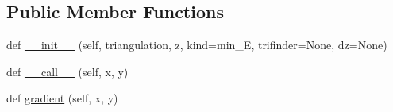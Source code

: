\subsection*{Public Member Functions}
\begin{DoxyCompactItemize}
\item 
def \hyperlink{classmatplotlib_1_1tri_1_1triinterpolate_1_1CubicTriInterpolator_a0c3d78be256683e57f25356c1fc7fc5f}{\+\_\+\+\_\+init\+\_\+\+\_\+} (self, triangulation, z, kind=\textquotesingle{}min\+\_\+E\textquotesingle{}, trifinder=None, dz=None)
\item 
def \hyperlink{classmatplotlib_1_1tri_1_1triinterpolate_1_1CubicTriInterpolator_acd8339c691a476835149466fa3e0fcd4}{\+\_\+\+\_\+call\+\_\+\+\_\+} (self, x, y)
\item 
def \hyperlink{classmatplotlib_1_1tri_1_1triinterpolate_1_1CubicTriInterpolator_a16ac27d3a77ed963eaaca315f1304a27}{gradient} (self, x, y)
\end{DoxyCompactItemize}


